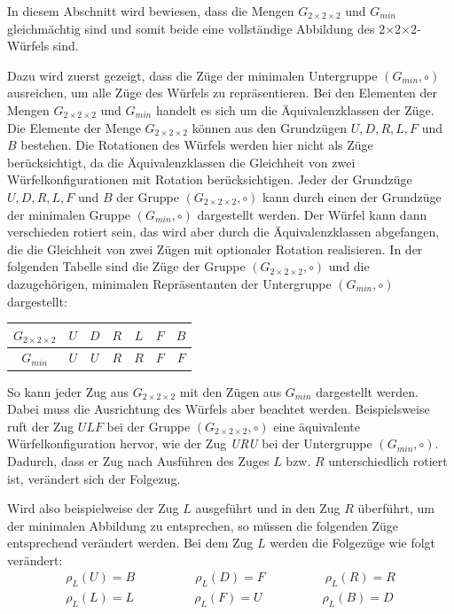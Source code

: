 \documentclass[12pt,a4paper, usenames, dvipsnames]{article}
\theoremstyle{mystyle}
\theoremstyle{definition}
\newcommand{\Gtwo}{\ensuremath{G_{2\times 2\times 2}}}
\newcommand{\Ttwo}{2$\times$2$\times$2-}
\begin{document}

In diesem Abschnitt wird bewiesen, dass die Mengen $\Gtwo$ und $G_{min}$ gleichmächtig sind und somit beide eine vollständige Abbildung des \Ttwo Würfels sind. 

Dazu wird zuerst gezeigt, dass die Züge der minimalen Untergruppe $(G_{min}, \circ)$ ausreichen, um alle Züge des Würfels zu repräsentieren. Bei den Elementen der Mengen $\Gtwo$ und $G_{min}$ handelt es sich um die Äquivalenzklassen der Züge. Die Elemente der Menge $\Gtwo$ können aus den Grundzügen $U, D, R, L, F$ und $B$ bestehen. Die Rotationen des Würfels werden hier nicht als Züge berücksichtigt, da die Äquivalenzklassen die Gleichheit von zwei Würfelkonfigurationen mit Rotation berücksichtigen.
Jeder der Grundzüge $U, D, R, L, F$ und $B$ der Gruppe $(\Gtwo, \circ)$ kann durch einen der Grundzüge der minimalen Gruppe $(G_{min}, \circ)$ dargestellt werden. Der Würfel kann dann verschieden rotiert sein, das wird aber durch die Äquivalenzklassen abgefangen, die die Gleichheit von zwei Zügen mit optionaler Rotation realisieren. In der folgenden Tabelle sind die Züge der Gruppe $(\Gtwo, \circ)$ und die dazugehörigen, minimalen Repräsentanten der Untergruppe $(G_{min}, \circ)$ dargestellt:

\begin{center}
\begin{tabular}{c c c c c c c }
$\Gtwo$ & $U$ & $D$ & $R$  & $L$  & $F$  & $B$  \\
\midrule
$G_{min}$ & $U$ & $U$ & $R$  & $R$  & $F$  & $F$  \\
\end{tabular}
\end{center}

So kann jeder Zug aus $\Gtwo$ mit den Zügen aus $G_{min}$ dargestellt werden. Dabei muss die Ausrichtung des Würfels aber beachtet werden. Beispielsweise ruft der Zug $ULF$ bei der Gruppe $(\Gtwo, \circ)$ eine äquivalente Würfelkonfiguration hervor, wie der Zug \textit{URU} bei der Untergruppe $(G_{min}, \circ)$. Dadurch, dass er Zug nach Ausführen des Zuges $L$ bzw. $R$ unterschiedlich rotiert ist, verändert sich der Folgezug.

Wird also beispielweise der Zug $L$ ausgeführt und in den Zug $R$ überführt, um der minimalen Abbildung zu entsprechen, so müssen die folgenden Züge entsprechend verändert werden. Bei dem Zug $L$ werden die Folgezüge wie folgt verändert:
\begin{align*}
\rho_L(U) = B \ \ \ \ \ \ \ \ \ \ \ \ \ \ \ \ \ \ \ \ \ \  \rho_L(D) = F \ \ \ \ \ \ \ \ \ \ \ \ \ \ \ \ \ \ \ \ \ \   \rho_L(R) = R \\
\rho_L(L) = L \ \ \ \ \ \ \ \ \ \ \ \ \ \ \ \ \ \ \ \ \ \  \rho_L(F) = U \ \ \ \ \ \ \ \ \ \ \ \ \ \ \ \ \ \ \ \ \ \  \rho_L(B) = D 
\end{align*}
\end{document}
